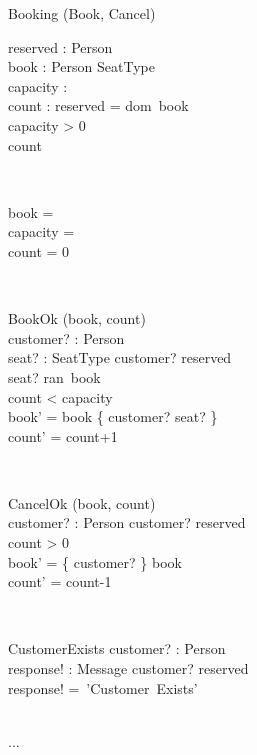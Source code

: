 \documentclass[12pt]{article}
\begin{document}
\begin{class}{Booking}
\also
\upharpoonright (Book, Cancel) \\
\begin{state}
reserved :  Person\\
book : Person \rightarrowtail SeatType\\ %
capacity : \\
count :  
\where
reserved = dom~book\\ 
capacity > 0\\
count 
\end{state} \\
\begin{init}
book = \emptyset\\
capacity = \\
count = 0
\end{init} \\
\begin{op}{BookOk}
\Delta (book, count) \\
customer? : Person\\
seat? : SeatType
\ST
customer? \notin reserved\\
seat? \notin ran~book\\
count < capacity\\
book' = book \cup \{ customer? \mapsto seat? \}\\
count' = count+1
\end{op}\\
\begin{op}{CancelOk}
\Delta (book, count) \\
customer? : Person
\ST
customer? \in reserved\\
count > 0\\
book' = \{ customer? \} \ndres book\\
count' = count-1
\end{op}\\
\begin{op}{CustomerExists}
customer? : Person\\
response! : Message
\ST
customer? \in reserved\\
response! =~'Customer~Exists'
\end{op}\\
...\\
\end{class}
\end{document}

